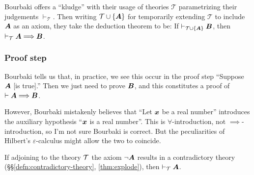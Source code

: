 Bourbaki offers a ``kludge'' with their usage of theories $\mathcal{T}$
parametrizing their judgements $\vdash_{\mathcal{T}}$. Then writing
$\mathcal{T}\cup\{\boldsymbol{A}\}$ for temporarily extending
$\mathcal{T}$ to include $\boldsymbol{A}$ as an axiom, they take the
deduction theorem to be: If
$\vdash_{\mathcal{T}\cup\{\boldsymbol{A}\}}\boldsymbol{B}$, then $\vdash_{\mathcal{T}}\boldsymbol{A}\Longrightarrow\boldsymbol{B}$.

\subsubsection{Proof step}
Bourbaki tells us that, in practice, we see this occur in the proof step
``Suppose $\boldsymbol{A}$ [is true].'' Then we just need to prove
$\boldsymbol{B}$, and this constitutes a proof of $\vdash\boldsymbol{A}\Longrightarrow\boldsymbol{B}$.

However, Bourbaki mistakenly believes that ``Let $\boldsymbol{x}$ be a
real number'' introduces the auxiliary hypothesis ``$\boldsymbol{x}$
is a real number''. This is $\forall$-introduction, not
$\implies$-introduction, so I'm not sure Bourbaki is correct. But the
peculiarities of Hilbert's $\varepsilon$-calculus might allow the two to
coincide. 


\begin{dc}\label{c15}%
If adjoining to the theory $\mathcal{T}$ the axiom $\neg\boldsymbol{A}$
results in a contradictory theory (\S\S\ref{defn:contradictory-theory}, \ref{thm:explode}),
then $\vdash_{\mathcal{T}}\boldsymbol{A}$.
\end{dc}

